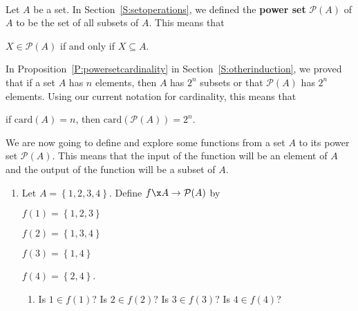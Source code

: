\begin{previewactivity}\label{PA:powerset} \hfill \\
Let $A$ be a set.  In Section~\ref{S:setoperations}, we defined the \textbf{power set}
% 
$\mathcal{P} ( A )$ of $A$ to be the set of all subsets of $A$.  This means that
\begin{center}
$X \in \mathcal{P} ( A )$ if and only if $X \subseteq A$.
\end{center}
%
In Proposition~\ref{P:powersetcardinality} in Section~\ref{S:otherinduction}, we proved that if a set $A$ has $n$ elements, then $A$ has $2^n$ subsets or that $\mathcal{P} ( A )$ has 
$2^n$ elements.  Using our current notation for cardinality, this means that
%
\begin{center}
if $\text{card} ( A ) = n$, then 
$\text{card} ( \mathcal{P} ( A ) ) = 2^n$.
\end{center}
%
%
We are now going to define and explore some functions from a set $A$ to its power set 
$\mathcal{P} ( A )$.  This means that the input of the function will be an element of $A$ and the output of the function will be a subset of $A$.

\begin{enumerate} 
\item Let $A = \left\{1, 2, 3, 4 \right\}$.  Define $f\x A \to \mathcal{P} ( A )$ by
%
\begin{multicols}{2}
$f ( 1 ) = \left\{ 1, 2, 3 \right\}$

$f ( 2 ) = \left\{ 1, 3, 4 \right\}$

$f ( 3 ) = \left\{ 1, 4 \right\}$

$f ( 4 ) = \left\{ 2, 4 \right\}$.
\end{multicols}
%
\begin{enumerate}
\item Is $1 \in f ( 1 )$?  Is $2 \in f ( 2 )$? Is 
$3 \in f ( 3 )$?  Is $4 \in f ( 4 )$?


\end{enumerate}
\end{enumerate}
\end{previewactivity}
